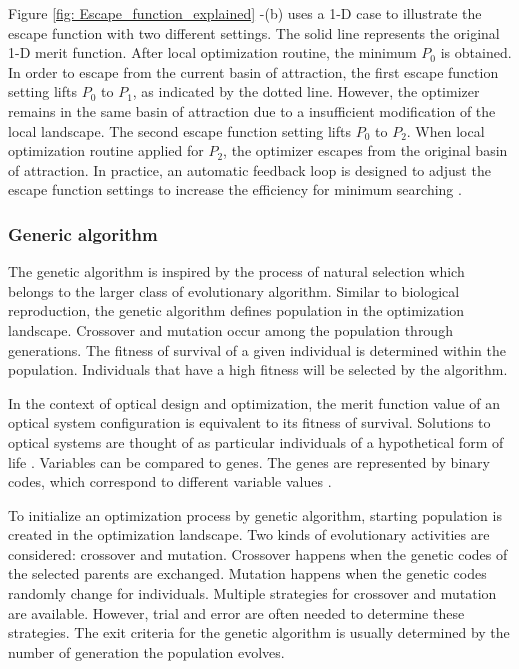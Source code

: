 Figure \ref{fig: Escape_function_explained} -(b) uses a 1-D case to illustrate the escape function with two different settings. The solid line represents the original 1-D merit function. After local optimization routine, the minimum $P_0$ is obtained. In order to escape from the current basin of attraction, the first escape function setting lifts $P_0$ to $P_1$, as indicated by the dotted line. However, the optimizer remains in the same basin of attraction due to a insufficient modification of the local landscape. The second escape function setting lifts $P_0$ to $P_2$. When local optimization routine applied for $P_2$, the optimizer escapes from the original basin of attraction. In practice, an automatic feedback loop is designed to adjust the escape function settings to increase the efficiency for minimum searching \cite{Isshiki1998}.


\subsubsection{Generic algorithm}

The genetic algorithm is inspired by the process of natural selection which belongs to the larger class of evolutionary algorithm. Similar to biological reproduction, the genetic algorithm defines population in the optimization landscape. Crossover and mutation occur among the population through generations. The fitness of survival of a given individual is determined within the population. Individuals that have a high fitness will be selected by the algorithm.

In the context of optical design and optimization, the merit function value of an optical system configuration is equivalent to its fitness of survival. Solutions to optical systems are thought of as particular individuals of a hypothetical form of life \cite{Moore1999}. Variables can be compared to genes. The genes are represented by binary codes, which correspond to different variable values \cite{GAreview2018}. 

To initialize an optimization process by genetic algorithm, starting population is created in the optimization landscape. Two kinds of evolutionary activities are considered: crossover and mutation. Crossover happens when the genetic codes of the selected parents are exchanged. Mutation happens when the genetic codes randomly change for individuals. Multiple strategies for crossover and mutation are available. However, trial and error are often needed to determine these strategies. The exit criteria for the genetic algorithm is usually determined by the number of generation the population evolves. 

